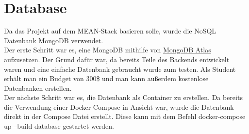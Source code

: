 \chapter{Database}\label{ch:db}
Da das Projekt auf dem MEAN-Stack basieren solle, wurde die NoSQL Datenbank MongoDB verwendet.\\
Der erste Schritt war es, eine MongoDB mithilfe von \hyperlink{https://www.mongodb.com/cloud/atlas}{MongoDB Atlas} aufzusetzen. Der Grund dafür war, da bereits Teile des Backends entwickelt waren und eine einfache Datenbank gebraucht wurde zum testen. Als Student erhält man ein Budget von 300\$ und man kann außerdem kostenlose Datenbanken erstellen.\\
Der nächste Schritt war es, die Datenbank als Container zu erstellen. Da bereits die Verwendung einer Docker Compose in Ansicht war, wurde die Datenbank direkt in der Compose Datei erstellt. Diese kann mit dem Befehl docker-compose up --build database gestartet werden.